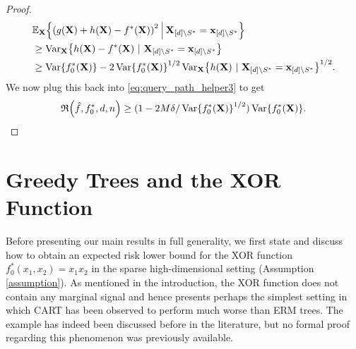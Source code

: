 \documentclass[11pt]{article}
\newcommand{\bx}{\mathbf{x}}
\newcommand{\bX}{\mathbf{X}}
\DeclarePairedDelimiter{\braces}{\lbrace}{\rbrace}
\DeclarePairedDelimiter{\paren}{(}{)}
\newcommand{\E}{\mathbb{E}}
\newcommand{\indicator}{\mathbb{1}}
\newcommand{\Var}{\operatorname{Var}}
\newcommand{\nfeats}{d}
\newcommand{\nsamples}{n}
\newcommand{\coordindices}{[\nfeats]}
\newcommand{\data}[1][n]{\mathcal{D}_{#1}}
\newcommand{\suppset}{S^*}
\newcommand{\objective}{\mathfrak{R}}
\newcommand{\ybound}{M}
\begin{document}
\begin{proof}
\begin{equation}
\begin{split}
            & \E_{\bX}\braces*{\paren*{g(\bX) + h(\bX) - f^*(\bX)}^2~\vline~ \bX_{\coordindices\backslash\suppset}=\bx_{\coordindices\backslash\suppset}} \\
            & \geq \Var_{\bX}\braces*{h(\bX) - f^*(\bX)~|~\bX_{\coordindices\backslash\suppset}=\bx_{\coordindices\backslash\suppset}} \\
            & \geq \Var\braces*{f_0^*(\bX)} - 2\Var\braces*{f_0^*(\bX)}^{1/2}\Var_{\bX}\braces*{h(\bX)~|~\bX_{\coordindices\backslash\suppset}=\bx_{\coordindices\backslash\suppset}}^{1/2}.
        \end{split}
    \end{equation}
    We now plug this back into \eqref{eq:query_path_helper3} 
    to get
    \begin{equation}
        \objective\paren*{\hat f, f^*_0,\nfeats,\nsamples} \geq (1-2\ybound\delta/\Var\braces*{f^*_0(\bX)}^{1/2})\Var\braces*{f^*_0(\bX)}. \qedhere
    \end{equation}    
\end{proof}


\section{Greedy Trees and the XOR Function}

Before presenting our main results in full generality,
we first state and discuss how to obtain an expected risk lower bound for the XOR function $f_0^*(x_1,x_2) = x_1x_2$ in the sparse high-dimensional setting (Assumption \ref{assumption}).
As mentioned in the introduction, the XOR function does not contain any marginal signal and hence presents perhaps the simplest setting in which CART has been observed to perform much worse than ERM trees.
The example has indeed been discussed before in the literature, but no formal proof regarding this phenomenon was previously available.
\end{document}
